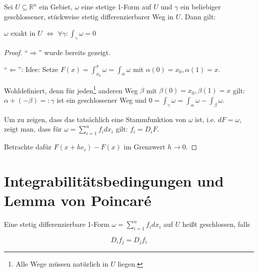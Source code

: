 \begin{theorem}
	Sei $U \subseteq \mathbb R^n$ ein Gebiet, $\omega$ eine stetige 1-Form auf $U$ und $\gamma$ ein beliebiger geschlossener, st\"uckweise stetig differenzierbarer Weg in $U$. Dann gilt:

	$\omega$ exakt in $U$ $\Leftrightarrow$ $\forall \gamma:\int_\gamma \omega = 0$
\end{theorem}
\begin{proof}
	``$\Rightarrow$'' wurde bereits gezeigt.
	
	``$\Leftarrow$'': Idee: Setze $F(x) = \int_{x_0}^x \omega = \int_\alpha \omega$ mit $\alpha(0)=x_0, \alpha(1)=x$.
	
	Wohldefiniert, denn f\"ur jeden\footnote{Alle Wege m\"ussen nat\"urlich in $U$ liegen.} anderen Weg $\beta$ mit $\beta(0)=x_0, \beta(1)=x$ gilt: $\alpha + (-\beta)=:\gamma$ ist ein geschlossener Weg und $0 = \int_\gamma \omega = \int_\alpha \omega - \int_\beta \omega$.
	
	Um zu zeigen, dass das tats\"achlich eine Stammfunktion von $\omega$ ist, i.e. $dF = \omega$, zeigt man, dass f\"ur $\omega = \sum_{i=1}^n f_i dx_i$ gilt: $f_i = D_i F$.
	
	Betrachte daf\"ur $F(x+he_i)-F(x)$ im Grenzwert $h\rightarrow 0$.
\end{proof}



\section{Integrabilit\"atsbedingungen und Lemma von Poincar\'e}
\begin{definition}[Geschlossenheit]
	Eine stetig differenzierbare 1-Form $\omega = \sum_{i=1}^n f_i dx_i$ auf $U$ hei\ss t geschlossen, falls
	
	\begin{equation}\label{eq:integrationsbedingungenFuerGeschlossenheit}
		D_i f_j = D_j f_i
	\end{equation}

\end{definition}

